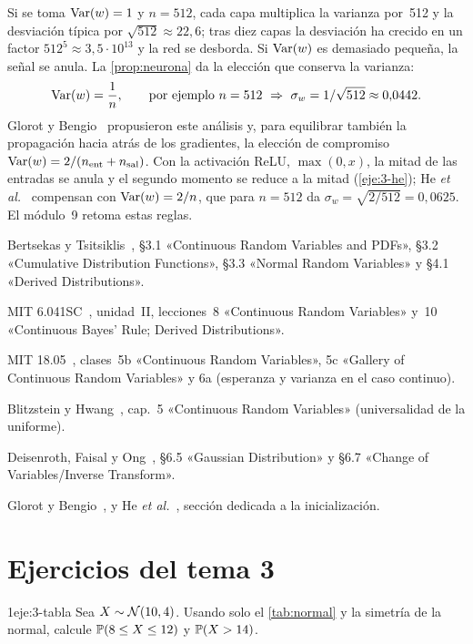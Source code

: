 Si se toma $\operatorname{Var}(w)=1$ y $n=512$, cada capa multiplica la varianza por~512 y la desviación típica por $\sqrt{512}\approx 22{,}6$; tras diez capas la desviación ha crecido en un factor $512^{5}\approx 3{,}5\cdot 10^{13}$ y la red se desborda. Si $\operatorname{Var}(w)$ es demasiado pequeña, la señal se anula. La \cref{prop:neurona} da la elección que conserva la varianza:
\[
\Var(w)=\frac1n,\qquad\text{por ejemplo } n=512\ \Rightarrow\ \sigma_w=1/\sqrt{512}\approx 0{,}0442.
\]
Glorot y Bengio~\cite{glorot} propusieron este análisis y, para equilibrar también la propagación hacia atrás de los gradientes, la elección de compromiso $\operatorname{Var}(w)=2/(n_{\mathrm{ent}}+n_{\mathrm{sal}})$. Con la activación ReLU, $\max(0,x)$, la mitad de las entradas se anula y el segundo momento se reduce a la mitad (\cref{eje:3-he}); He \emph{et al.}~\cite{he} compensan con $\operatorname{Var}(w)=2/n$, que para $n=512$ da $\sigma_w=\sqrt{2/512}=0{,}0625$. El módulo~9 retoma estas reglas.

\begin{lecturas}
\item Bertsekas y Tsitsiklis~\cite{bt}, §3.1 «Continuous Random Variables and PDFs», §3.2 «Cumulative Distribution Functions», §3.3 «Normal Random Variables» y §4.1 «Derived Distributions».
\item MIT 6.041SC~\cite{mit6041}, unidad~II, lecciones~8 «Continuous Random Variables» y~10 «Continuous Bayes' Rule; Derived Distributions».
\item MIT 18.05~\cite{mit1805}, clases~5b «Continuous Random Variables», 5c «Gallery of Continuous Random Variables» y 6a (esperanza y varianza en el caso continuo).
\item Blitzstein y Hwang~\cite{bh}, cap.~5 «Continuous Random Variables» (universalidad de la uniforme).
\item Deisenroth, Faisal y Ong~\cite{mml}, §6.5 «Gaussian Distribution» y §6.7 «Change of Variables/Inverse Transform».
\item Glorot y Bengio~\cite{glorot}, y He \emph{et al.}~\cite{he}, sección dedicada a la inicialización.
\end{lecturas}

\section*{Ejercicios del tema 3}

\begin{ejercicio}{1}{eje:3-tabla}
Sea $X\sim\mathcal{N}(10,4)$. Usando solo el \cref{tab:normal} y la simetría de la normal, calcule $\mathbb{P}(8\le X\le 12)$ y $\mathbb{P}(X>14)$.
\end{ejercicio}

